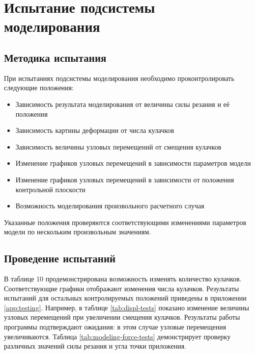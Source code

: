 \documentclass[14pt,oneside,final]{extreport}
\begin{document}
	\section{Испытание подсистемы моделирования}
	\subsection{Методика испытания}
	При испытаниях подсистемы моделирования необходимо проконтролировать следующие положения:
	\begin{itemize}
		\item Зависимость результата моделирования от величины силы резания и её положения
		\item Зависимость картины деформации от числа кулачков
		\item Зависимость величины узловых перемещений от смещения кулачков
		\item Изменение графиков узловых перемещений в зависимости параметров модели
		\item Изменение графиков узловых перемещений в зависимости от положения контрольной плоскости
		\item Возможность моделирования произвольного расчетного случая
	\end{itemize}
	
	Указанные положения проверяются соответствующими изменениями параметров модели по нескольким произвольным значениям. 
	

	\newpage
	\subsection{Проведение испытаний}	
	В таблице 10 продемонстрирована возможность изменять количество кулачков. Соответствующие графики отображают изменения числа кулачков. Результаты испытаний для остальных контролируемых положений приведены в приложении \ref{app:testing}. Например, в таблице \ref{tab:displ-tests} показано изменение величины узловых перемещений при увеличении смещения кулачков. Результаты работы программы подтверждают ожидания: в этом случае узловые перемещения увеличиваются. Таблица \ref{tab:modeling-force-tests} демонстрирует проверку различных значений силы резания и угла точки приложения. 
	
\end{document}
